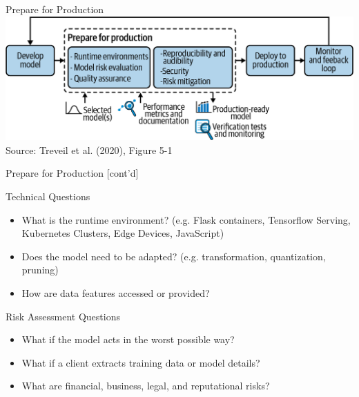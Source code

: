\documentclass[ignorenonframetext,xcolor=x11names]{beamer}
\begin{document}
\begin{frame}{Prepare for Production}
\centering
\includegraphics[width=\textwidth]{imlo_0501.png} \\

\vspace{\baselineskip}
\scriptsize Source: Treveil et al. (2020), Figure 5-1
\end{frame}

\begin{frame}{Prepare for Production \small [cont'd]}
\begin{block}{Technical Questions}
\begin{itemize}
   \item What is the runtime environment? (e.g. Flask containers, Tensorflow Serving, Kubernetes Clusters, Edge Devices, JavaScript)
   \item Does the model need to be adapted? (e.g. transformation, quantization, pruning)
   \item How are data features accessed or provided?
\end{itemize}
\end{block}
\begin{block}{Risk Assessment Questions}
\begin{itemize}
    \item What if the model acts in the worst possible way?
    \item What if a client extracts training data or model details?
    \item What are financial, business, legal, and reputational risks?
\end{itemize}
\end{block}
\end{frame}
\end{document}
